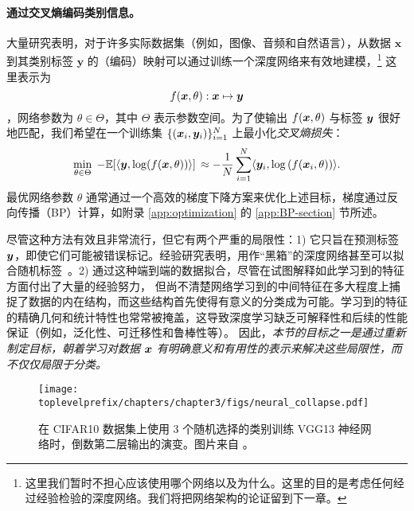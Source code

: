 \documentclass[../../book-main_zh.tex]{subfiles}
\begin{document}
\paragraph{通过交叉熵编码类别信息。}  大量研究表明，对于许多实际数据集（例如，图像、音频和自然语言），从数据 $\bm{x}$ 到其类别标签 $\bm{y}$ 的（编码）映射可以通过训练一个深度网络来有效地建模，\footnote{这里我们暂时不担心应该使用哪个网络以及为什么。这里的目的是考虑任何经过经验检验的深度网络。我们将把网络架构的论证留到下一章。} 这里表示为 $$f(\bm{x}, \theta):\bm{x} \mapsto \bm{y}$$，网络参数为 $\theta \in \Theta$，其中 $\Theta$ 表示参数空间。为了使输出 $f(\bm{x}, \theta)$ 与标签 $\bm{y}$ 很好地匹配，我们希望在一个训练集 $\{(\bm{x}_i, \bm{y}_i)\}_{i=1}^N$ 上最小化{\em 交叉熵损失}：
\begin{equation}
   \min_{\theta \in \Theta} \; - \mathbb{E}[\langle \bm{y}, \log(f(\bm{x}, \theta)) \rangle] \, \approx - \frac{1}{N}\sum_{i=1}^N \langle \bm{y}_i, \log\left(f(\bm{x}_i, \theta)\right) \rangle.
   \label{chap4-eqn:cross-entropy}
\end{equation}
最优网络参数 $\theta$ 通常通过一个高效的梯度下降方案来优化上述目标，梯度通过反向传播（BP）计算，如附录 \ref{app:optimization} 的 \ref{app:BP-section} 节所述。

尽管这种方法有效且非常流行，但它有两个严重的局限性：1) 它只旨在预测标签 $\bm{y}$，即使它们可能被错误标记。经验研究表明，用作“黑箱”的深度网络甚至可以拟合随机标签~\cite{zhang2017understanding}。2) 通过这种端到端的数据拟合，尽管在试图解释如此学习到的特征方面付出了大量的经验努力，%
但尚不清楚网络学习到的中间特征在多大程度上捕捉了数据的内在结构，而这些结构首先使得有意义的分类成为可能。学习到的特征的精确几何和统计特性也常常被掩盖，这导致深度学习缺乏可解释性和后续的性能保证（例如，泛化性、可迁移性和鲁棒性等）。
因此，{\em 本节的目标之一是通过重新制定目标，朝着学习对数据 $\bm{x}$ 有明确意义和有用性的表示来解决这些局限性，而不仅仅局限于分类。}

\begin{figure}
	\centering
	\texttt{[image: \\toplevelprefix/chapters/chapter3/figs/neural\_collapse.pdf]}
	\caption{在 CIFAR10 数据集上使用 3 个随机选择的类别训练 VGG13 神经网络时，倒数第二层输出的演变。图片来自 \cite{papyan2020prevalence}。}
	\label{chap4-fig:neural-collapse}
\end{figure}
\end{document}
